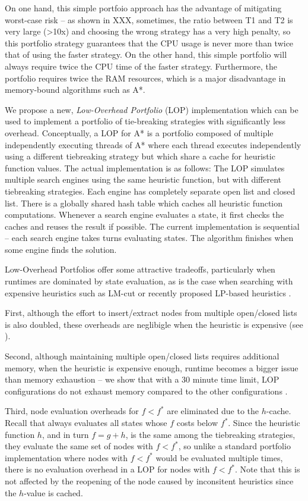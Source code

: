 On one hand, this simple portfoio approach has the advantage of mitigating worst-case risk -- as shown in XXX, sometimes, the ratio between T1 and T2 is very large (>10x) and choosing the wrong strategy has a very high penalty, so this portfolio strategy guarantees that the CPU usage is never more than twice that of using the faster strategy.
On the other hand, this simple portfolio will always require twice the CPU time of the faster strategy. Furthermore, the portfolio requires twice the RAM resources, which is a major disadvantage in memory-bound algorithms such as A*.

We propose a new, \emph{Low-Overhead Portfolio} (LOP) implementation which can be used to implement a portfolio of tie-breaking strategies with significantly less overhead.
Conceptually, a LOP for A* is a portfolio composed of multiple independently executing threads of A*  where each thread  executes independently using a different tiebreaking strategy but which share a cache for heuristic function values.
The actual implementation is as follows:
The LOP simulates
multiple search engines using the same heuristic function, but with
different tiebreaking strategies.  Each engine has completely separate
open list and closed list.  There is a globally shared hash
table which caches all heuristic function computations.  Whenever a
search engine evaluates a state, it first checks the caches and 
reuses the result if possible.  The current implementation is sequential -- each search engine takes  turns 
evaluating states. The algorithm finishes when some engine finds the solution.


Low-Overhead Portfolios offer some attractive tradeoffs,
particularly when runtimes are dominated by state evaluation, as is the case when searching with 
expensive heuristics such as LM-cut or recently proposed LP-based heuristics \cite{Pommereningetal14}.

First, although the effort to insert/extract nodes from multiple open/closed lists is also doubled, these overheads
are neglibigle when the heuristic is expensive (see ).

Second, although maintaining multiple open/closed lists requires additional memory,
when the heuristic is expensive enough, runtime becomes a bigger issue than memory exhaustion  -- we show that with a 30 minute time limit, LOP configurations do not exhaust memory compared to the other configurations .

Third, node evaluation overheads for $f < f^*$ are eliminated due to the $h$-cache.
Recall that \astar always evaluates all states whose $f$ costs 
below $f^*$. Since the heuristic function $h$, and in turn $f=g+h$, is
the same among the tiebreaking strategies, they evaluate the same set of
nodes with $f<f^*$, so unlike a standard portfolio implementation where 
nodes with $f<f^*$ would be evaluated multiple times, there is no evaluation overhead in a LOP
for nodes with $f<f^*$.
Note that this is not
affected by the reopening of the node caused by inconsitent heuristics
since the $h$-value is cached.

